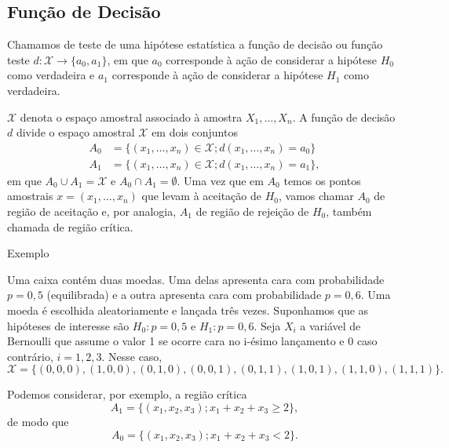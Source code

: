 \documentclass[12pt]{beamer}
\begin{document}
\subsection{Função de Decisão}
\begin{frame}{}
\begin{definicao}
    \justifying
    Chamamos de teste de uma hipótese estatística a função de decisão ou função teste $d : \mathcal{X} \to \{a_0, a_1\}$, em que $a_0$ corresponde à ação de considerar a hipótese \(H_0\) como verdadeira e $a_1$ corresponde à ação de considerar a hipótese \(H_1\) como verdadeira.

\end{definicao}
\begin{block}{}
\justifying
$\mathcal{X}$ denota o espaço amostral associado à amostra \(X_1, \ldots ,X_n\). A função de decisão \(d\) divide o espaço amostral $\mathcal{X}$ em dois conjuntos
\begin{align*}
A_0 &= \{(x_1, \ldots , x_n) \in \mathcal{X}; d(x_1, \ldots , x_n) = a_0\} \\
A_1 &= \{(x_1, \ldots , x_n) \in \mathcal{X}; d(x_1, \ldots , x_n) = a_1\},
\end{align*}
em que \(A_0 \cup A_1 = \mathcal{X}\) e \(A_0 \cap A_1 = \emptyset\). Uma vez que em \(A_0\) temos os pontos amostrais
\(x = (x_1, \ldots , x_n)\) que levam à aceitação de \(H_0\), vamos chamar \(A_0\) de região de aceitação e, por analogia, \(A_1\) de região de rejeição de \(H_0\), também chamada de região crítica.

\end{block}
\end{frame}

\begin{frame}{Exemplo}
\begin{block}{}
\justifying
Uma caixa contém duas moedas. Uma delas apresenta cara com probabilidade \(p = 0,5\) (equilibrada) e a outra apresenta cara com probabilidade \(p = 0,6\). Uma moeda é escolhida aleatoriamente e lançada três vezes. Suponhamos que as hipóteses de interesse são \(H_0 : p = 0,5\) e \(H_1 : p = 0,6\). Seja \(X_i\) a variável de Bernoulli que assume o valor 1 se ocorre cara no i-ésimo lançamento e 0 caso contrário, \(i = 1, 2, 3\). Nesse caso,
{\footnotesize
\[
\mathcal{X} = \{(0, 0, 0), (1, 0, 0), (0, 1, 0), (0, 0, 1), (0, 1, 1), (1, 0, 1), (1, 1, 0), (1, 1, 1)\}.
\]}

Podemos considerar, por exemplo, a região crítica
\[
A_1 = \{(x_1, x_2, x_3); x_1 + x_2 + x_3 \geq 2\},
\]
de modo que
\[
A_0 = \{(x_1, x_2, x_3); x_1 + x_2 + x_3 < 2\}.
\]
\end{block}
\end{frame}
\end{document}
